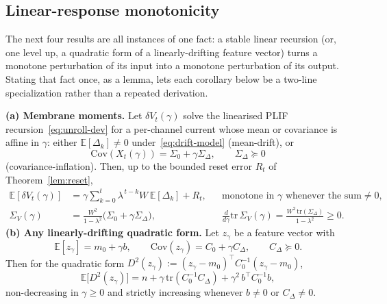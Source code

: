 ﻿\documentclass{article} %
\theoremstyle{remark}
\begin{document}
\subsection{Linear-response monotonicity}
\label{app:theory-linresponse}

The next four results are all instances of one fact: a stable linear recursion (or, one level up, a
quadratic form of a linearly-drifting feature vector) turns a monotone perturbation of its input into
a monotone perturbation of its output. Stating that fact once, as a lemma, lets each corollary below
be a two-line specialization rather than a repeated derivation.

\begin{lemma}
\label{lem:linresponse}
\textbf{(a) Membrane moments.} Let $\delta V_t(\gamma)$ solve the linearised PLIF
recursion~\eqref{eq:unroll-dev} for a per-channel current whose mean or covariance is affine in
$\gamma$: either $\mathbb{E}[\Delta_k]\neq0$ under~\eqref{eq:drift-model} (mean-drift), or
\begin{equation}
  \mathrm{Cov}(X_t(\gamma)) = \Sigma_0+\gamma\Sigma_\Delta, \qquad \Sigma_\Delta\succeq0
  \label{eq:var-assumption}
\end{equation}
(covariance-inflation). Then, up to the bounded reset error $R_t$ of Theorem~\ref{lem:reset},
\begin{align}
  \mathbb{E}[\delta V_t(\gamma)] &= \gamma\sum_{k=0}^{t}\lambda^{\,t-k}W\,\mathbb{E}[\Delta_k] + R_t,
    &&\text{monotone in }\gamma\text{ whenever the sum}\neq0, \label{eq:lin-mean}\\
  \Sigma_V(\gamma) &= \frac{W^2}{1-\lambda^2}\bigl(\Sigma_0+\gamma\Sigma_\Delta\bigr),
    &&\frac{d}{d\gamma}\mathrm{tr}\,\Sigma_V(\gamma) = \frac{W^2\,\mathrm{tr}(\Sigma_\Delta)}{1-\lambda^2}\ge0.
  \label{eq:lin-var}
\end{align}
\textbf{(b) Any linearly-drifting quadratic form.} Let $z_\gamma$ be a feature vector with
\begin{equation}
  \mathbb{E}[z_\gamma] = m_0+\gamma b, \qquad \mathrm{Cov}(z_\gamma) = C_0+\gamma C_\Delta,
  \qquad C_\Delta\succeq0.
  \label{eq:linresponse-assumptions}
\end{equation}
Then for the quadratic form $D^2(z_\gamma) := (z_\gamma-m_0)^\top C_0^{-1}(z_\gamma-m_0)$,
\begin{equation}
  \mathbb{E}\bigl[D^2(z_\gamma)\bigr] = n + \gamma\,\mathrm{tr}(C_0^{-1}C_\Delta) + \gamma^2\,b^\top C_0^{-1}b,
  \label{eq:lin-quad}
\end{equation}
non-decreasing in $\gamma\ge0$ and strictly increasing whenever $b\neq0$ or $C_\Delta\neq0$.
\end{lemma}
\end{document}
